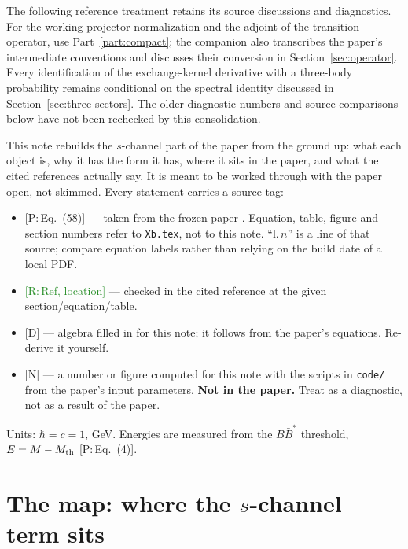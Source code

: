 \documentclass[11pt,a4paper]{article}
\newcommand{\tagP}[1]{\textcolor{blue!65!black}{\textsf{\small[P:\,#1]}}}
\newcommand{\tagR}[1]{\textcolor{ForestGreen}{\textsf{\small[R:\,#1]}}}
\newcommand{\tagD}{\textcolor{orange!85!black}{\textsf{\small[D]}}}
\newcommand{\tagN}{\textcolor{red!70!black}{\textsf{\small[N]}}}
\newcommand{\BBst}{B\bar B^*}
\newcommand{\Mth}{M_{\rm th}}
\begin{document}
\begin{warnbox}
The following reference treatment retains its source discussions and
diagnostics. For the working projector normalization and the adjoint of
the transition operator, use Part~\ref{part:compact}; the companion also
transcribes the paper's intermediate conventions and discusses their
conversion in Section~\ref{sec:operator}. Every identification of the
exchange-kernel derivative with a three-body probability remains
conditional on the spectral identity discussed in
Section~\ref{sec:three-sectors}. The older diagnostic numbers and source
comparisons below have not been rechecked by this consolidation.
\end{warnbox}
\begin{keybox}
This note rebuilds the $s$-channel part of the paper from the ground up: what each object is, why it has the form it has, where it sits in the paper, and what the cited references actually say. It is meant to be worked through with the paper open, not skimmed. Every statement carries a source tag:
\begin{itemize}
\item \tagP{Eq.~(58)} --- taken from the frozen paper \cite{Zhang:2026iyr}. Equation, table, figure and section numbers refer to \texttt{Xb.tex}, not to this note. ``l.\,$n$'' is a line of that source; compare equation labels rather than relying on the build date of a local PDF.
\item \tagR{Ref, location} --- checked in the cited reference at the given section/equation/table.
\item \tagD{} --- algebra filled in for this note; it follows from the paper's equations. Re-derive it yourself.
\item \tagN{} --- a number or figure computed for this note with the scripts in \texttt{code/} from the paper's input parameters. \textbf{Not in the paper.} Treat as a diagnostic, not as a result of the paper.
\end{itemize}
Units: $\hbar=c=1$, GeV. Energies are measured from the $\BBst$ threshold, $E=M-\Mth$ \tagP{Eq.~(4)}.
\end{keybox}


\section{The map: where the $s$-channel term sits}
\end{document}
